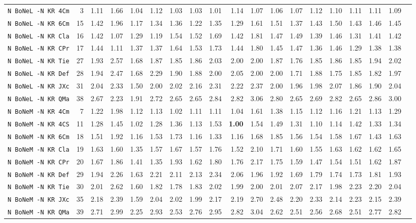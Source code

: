 \begin{tabular}{l | r @{~~} r | r@{~~}r@{~~}r@{~~}r@{~~}r@{~~}r@{~~}r@{~~}r@{~~}r@{~~}r@{~~}r@{~~}r@{~~}r@{~~}r@{~~}r@{~~}r|}
\verb+N BoNeL -N KR 4Cm+ & 3 & 1.11 & 1.66&1.04&1.12&1.03&1.03&1.01&1.14&1.07&1.06&1.07&1.12&1.10&1.11&1.11&1.09\\
\verb+N BoNeL -N KR 6Cm+ & 15 & 1.42 & 1.96&1.17&1.34&1.36&1.22&1.35&1.29&1.61&1.51&1.37&1.43&1.50&1.43&1.46&1.45\\
\verb+N BoNeL -N KR Cla+ & 16 & 1.42 & 1.07&1.29&1.19&1.54&1.52&1.69&1.42&1.81&1.47&1.49&1.39&1.46&1.31&1.41&1.42\\
\verb+N BoNeL -N KR CPr+ & 17 & 1.44 & 1.11&1.37&1.37&1.64&1.53&1.73&1.44&1.80&1.45&1.47&1.36&1.46&1.29&1.38&1.38\\
\verb+N BoNeL -N KR Tie+ & 27 & 1.93 & 2.57&1.68&1.87&1.85&1.86&2.03&2.00&2.00&1.87&1.76&1.85&1.86&1.85&1.94&2.02\\
\verb+N BoNeL -N KR Def+ & 28 & 1.94 & 2.47&1.68&2.29&1.90&1.88&2.00&2.05&2.00&2.00&1.71&1.88&1.75&1.85&1.82&1.97\\
\verb+N BoNeL -N KR JXc+ & 31 & 2.04 & 2.33&1.50&2.00&2.02&2.16&2.31&2.22&2.37&2.00&1.96&1.98&2.07&1.86&1.90&2.04\\
\verb+N BoNeL -N KR QMa+ & 38 & 2.67 & 2.23&1.91&2.72&2.65&2.65&2.84&2.82&3.06&2.80&2.65&2.69&2.82&2.65&2.86&3.00\smallskip \\
\verb+N BoNeM -N KR 4Cm+ & 7 & 1.22 & 1.98&1.12&1.13&1.02&1.11&1.11&1.04&1.61&1.38&1.15&1.12&1.16&1.21&1.13&1.29\\
\verb+N BoNeM -N KR 4CS+ & 11 & 1.28 & 1.45&1.02&1.28&1.36&1.13&1.53&\textbf{1.00}&1.54&1.49&1.31&1.10&1.14&1.42&1.33&1.34\\
\verb+N BoNeM -N KR 6Cm+ & 18 & 1.51 & 1.92&1.16&1.53&1.73&1.16&1.33&1.16&1.68&1.85&1.56&1.54&1.58&1.67&1.43&1.63\\
\verb+N BoNeM -N KR Cla+ & 19 & 1.63 & 1.60&1.35&1.57&1.67&1.57&1.76&1.52&2.10&1.71&1.60&1.55&1.63&1.62&1.62&1.65\\
\verb+N BoNeM -N KR CPr+ & 20 & 1.67 & 1.86&1.41&1.35&1.93&1.62&1.80&1.76&2.17&1.75&1.59&1.47&1.54&1.51&1.62&1.87\\
\verb+N BoNeM -N KR Def+ & 29 & 1.94 & 2.26&1.63&2.21&2.11&2.13&2.34&2.06&1.96&1.92&1.69&1.79&1.74&1.73&1.81&1.93\\
\verb+N BoNeM -N KR Tie+ & 30 & 2.01 & 2.62&1.60&1.82&1.78&1.83&2.02&1.99&2.00&2.01&2.07&2.17&1.98&2.23&2.20&2.04\\
\verb+N BoNeM -N KR JXc+ & 35 & 2.18 & 2.39&1.59&2.04&2.02&1.99&2.17&2.19&2.70&2.48&2.20&2.33&2.14&2.23&2.15&2.39\\
\verb+N BoNeM -N KR QMa+ & 39 & 2.71 & 2.99&2.25&2.93&2.53&2.76&2.95&2.82&3.04&2.62&2.51&2.56&2.68&2.51&2.77&2.82\smallskip \\

\end{tabular}

